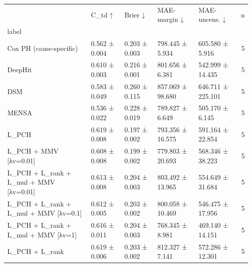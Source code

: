 \begin{tabular}{lllllr}
\toprule
 & C\_td ↑ & Brier ↓ & MAE-margin ↓ & MAE-uncens. ↓ & n \\
label &  &  &  &  &  \\
\midrule
Cox PH (cause-specific) & 0.562 ± 0.004 & 0.203 ± 0.003 & 798.445 ± 5.934 & 605.580 ± 5.916 & 5 \\
DeepHit & 0.610 ± 0.003 & 0.216 ± 0.001 & 801.656 ± 6.381 & 542.999 ± 14.435 & 5 \\
DSM & 0.583 ± 0.049 & 0.260 ± 0.115 & 857.069 ± 98.680 & 646.711 ± 225.101 & 5 \\
MENSA & 0.536 ± 0.022 & 0.228 ± 0.019 & 789.827 ± 6.649 & 505.170 ± 6.145 & 5 \\
L\_PCH & 0.619 ± 0.008 & 0.197 ± 0.002 & 793.356 ± 16.575 & 591.164 ± 22.854 & 5 \\
L\_PCH + MMV [λv=0.01] & 0.608 ± 0.008 & 0.199 ± 0.002 & 779.803 ± 20.693 & 568.346 ± 38.223 & 5 \\
L\_PCH + L\_rank + L\_mul + MMV [λv=0.01] & 0.613 ± 0.008 & 0.204 ± 0.003 & 803.492 ± 13.965 & 554.649 ± 31.684 & 5 \\
L\_PCH + L\_rank + L\_mul + MMV [λv=0.1] & 0.612 ± 0.005 & 0.203 ± 0.002 & 800.058 ± 10.469 & 546.475 ± 17.956 & 5 \\
L\_PCH + L\_rank + L\_mul + MMV [λv=1] & 0.616 ± 0.011 & 0.204 ± 0.003 & 768.345 ± 8.981 & 469.140 ± 14.151 & 5 \\
L\_PCH + L\_rank & 0.619 ± 0.006 & 0.203 ± 0.002 & 812.327 ± 7.141 & 572.286 ± 12.301 & 5 \\
\bottomrule
\end{tabular}
